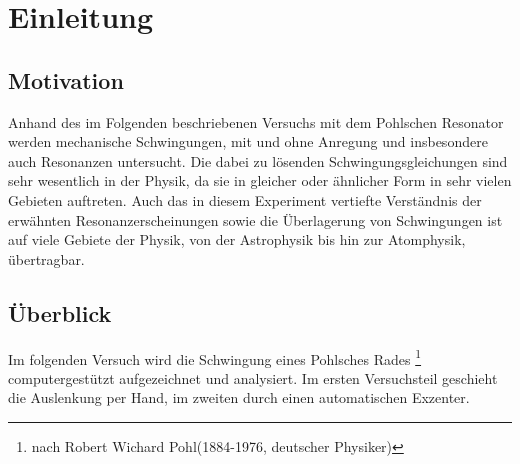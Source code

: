 \section{Einleitung}
\subsection{Motivation}
Anhand des im Folgenden beschriebenen Versuchs mit dem Pohlschen Resonator werden mechanische Schwingungen,
mit und ohne Anregung und insbesondere auch Resonanzen untersucht. Die dabei zu lösenden Schwingungsgleichungen sind 
sehr wesentlich in der Physik, da sie in gleicher oder ähnlicher Form in sehr vielen Gebieten auftreten.
Auch das in diesem Experiment vertiefte Verständnis der erwähnten Resonanzerscheinungen sowie die Überlagerung von 
Schwingungen ist auf viele Gebiete der Physik, von der Astrophysik bis hin zur Atomphysik, übertragbar.   

\subsection{Überblick}
Im folgenden Versuch wird die Schwingung eines \glqq Pohlsches Rades\grqq{} \footnote[1]{nach Robert Wichard Pohl(1884-1976, 
deutscher Physiker)} computergestützt aufgezeichnet und analysiert. Im ersten Versuchsteil geschieht die Auslenkung per Hand,
im zweiten durch einen automatischen Exzenter.
